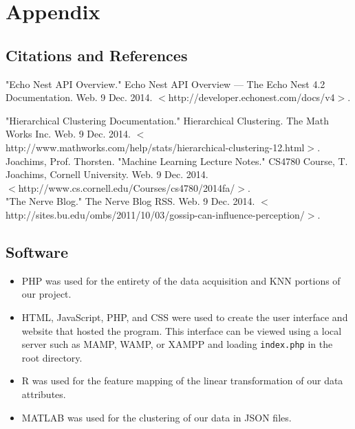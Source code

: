 \documentclass{article}
\begin{document}
\section{Appendix}
\subsection{Citations and References}
"Echo Nest API Overview." Echo Nest API Overview — The Echo Nest 4.2
Documentation. Web. 9 Dec. 2014. $<$http://developer.echonest.com/docs/v4$>$.

"Hierarchical Clustering Documentation." Hierarchical Clustering. The Math Works
Inc. Web. 9 Dec. 2014.
$<$http://www.mathworks.com/help/stats/hierarchical-clustering-12.html$>$. \\

Joachims, Prof. Thorsten. "Machine Learning Lecture Notes." CS4780 Course, T.
Joachims, Cornell University. Web. 9 Dec. 2014.\\
$<$http://www.cs.cornell.edu/Courses/cs4780/2014fa/$>$. \\

"The Nerve Blog." The Nerve Blog RSS. Web. 9 Dec. 2014.
$<$http://sites.bu.edu/ombs/2011/10/03/gossip-can-influence-perception/$>$.

\subsection{Software}
\begin{itemize}
\item PHP was used for the entirety of the data acquisition and KNN portions of
  our project.
\item HTML, JavaScript, PHP, and CSS were used to create the user interface and
  website that hosted the program. This interface can be viewed using a local
  server such as MAMP, WAMP, or XAMPP and loading \texttt{index.php} in the root
  directory.
\item R was used for the feature mapping of the linear transformation of our
  data attributes.
\item MATLAB was used for the clustering of our data in JSON files.
\end{itemize}
\end{document}
